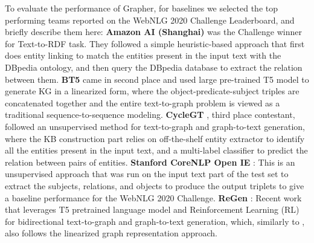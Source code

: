 To evaluate the performance of Grapher, for baselines we selected the top performing teams reported on the WebNLG 2020 Challenge Leaderboard, and briefly describe them here:
\textbf{Amazon AI (Shanghai)} \cite{guo-etal-2020-2} was the Challenge winner for Text-to-RDF task. They followed a simple heuristic-based approach that first does entity linking to match the entities present in the input text with the DBpedia ontology, and then query the DBpedia database to extract the relation between them.
\textbf{BT5} \cite{agarwal-etal-2020-machine} came in second place and used large pre-trained T5 model to generate KG in a linearized form, where the object-predicate-subject triples are concatenated together and the entire text-to-graph problem is viewed as a traditional sequence-to-sequence modeling.
\textbf{CycleGT} \cite{Guo2020CycleGTUG}, third place contestant, followed an unsupervised method for text-to-graph and graph-to-text generation, where the KB construction part relies on off-the-shelf entity extractor to identify all the entities present in the input text, and a multi-label classifier to predict the relation between pairs of entities.
\textbf{Stanford CoreNLP Open IE} \cite{manning-etal-2014-stanford}: This is an unsupervised approach that was run on the input text part of the test set to extract the subjects, relations, and objects to produce the output triplets to give a baseline performance for the WebNLG 2020 Challenge.
\textbf{ReGen} \cite{dognin2021regen}: Recent work that leverages T5 pretrained language model and Reinforcement Learning (RL) for bidirectional text-to-graph and graph-to-text generation, which, similarly to  \citet{agarwal-etal-2020-machine}, also follows the linearized graph representation approach. 


